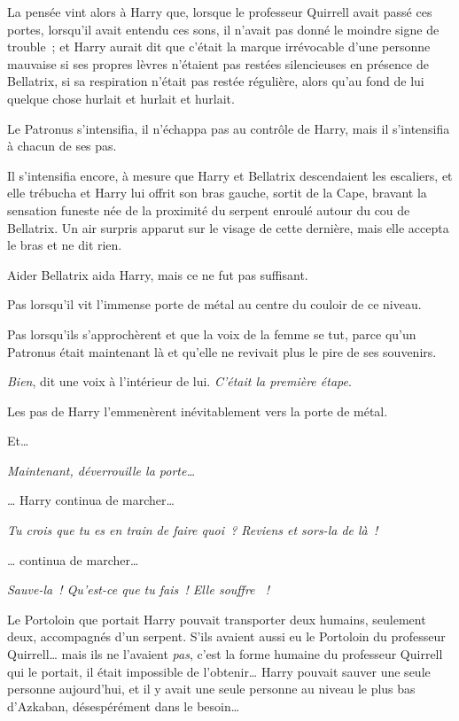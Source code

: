 La pensée vint alors à Harry que, lorsque le professeur Quirrell avait passé ces portes, lorsqu'il avait entendu ces sons, il n'avait pas donné le moindre signe de trouble~; et Harry aurait dit que c'était la marque irrévocable d'une personne mauvaise si ses propres lèvres n'étaient pas restées silencieuses en présence de Bellatrix, si sa respiration n'était pas restée régulière, alors qu'au fond de lui quelque chose hurlait et hurlait et hurlait.

Le Patronus s'intensifia, il n'échappa pas au contrôle de Harry, mais il s'intensifia à chacun de ses pas.

Il s'intensifia encore, à mesure que Harry et Bellatrix descendaient les escaliers, et elle trébucha et Harry lui offrit son bras gauche, sortit de la Cape, bravant la sensation funeste née de la proximité du serpent enroulé autour du cou de Bellatrix. Un air surpris apparut sur le visage de cette dernière, mais elle accepta le bras et ne dit rien.

Aider Bellatrix aida Harry, mais ce ne fut pas suffisant.

Pas lorsqu'il vit l'immense porte de métal au centre du couloir de ce niveau.

Pas lorsqu'ils s'approchèrent et que la voix de la femme se tut, parce qu'un Patronus était maintenant là et qu'elle ne revivait plus le pire de ses souvenirs.

\emph{Bien}, dit une voix à l'intérieur de lui. \emph{C'était la première étape}.

Les pas de Harry l'emmenèrent inévitablement vers la porte de métal.

Et…

\emph{Maintenant, déverrouille la porte…}

… Harry continua de marcher…

\emph{Tu crois que tu es en train de faire quoi~? Reviens et sors-la de là~!}

… continua de marcher…

\emph{Sauve-la~! Qu'est-ce que tu fais~! Elle souffre ~!}

Le Portoloin que portait Harry pouvait transporter deux humains, seulement deux, accompagnés d'un serpent. S'ils avaient aussi eu le Portoloin du professeur Quirrell… mais ils ne l'avaient \emph{pas}, c'est la forme humaine du professeur Quirrell qui le portait, il était impossible de l'obtenir… Harry pouvait sauver une seule personne aujourd'hui, et il y avait une seule personne au niveau le plus bas d'Azkaban, désespérément dans le besoin…

